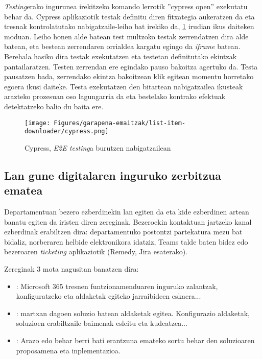 \textit{Testing}erako ingurunea irekitzeko komando lerrotik ''cypress open'' exekutatu behar da. Cypress aplikaziotik testak definitu diren fitxategia aukeratzen da eta tresnak kontrolatutako nabigatzaile-leiho bat irekiko da, \ref{cypress} irudian ikus daiteken moduan. Leiho honen alde batean test multzoko testak zerrendatzen dira alde batean, eta bestean zerrendaren orrialdea kargatu egingo da \textit{iframe} batean. Berehala hasiko dira testak exekutatzen eta testetan definitutako ekintzak pantailaratzen. Testen zerrendan ere egindako pauso bakoitza agertuko da. Testa pausatzen bada, zerrendako ekintza bakoitzean klik egitean momentu horretako egoera ikusi daiteke. Testa exekutatzen den bitartean nabigatzailea ikusteak arazteko prozesuan oso lagungarria da eta bestelako kontrako efektuak detektatzeko balio du baita ere. 

\begin{figure}[H]
\vspace{0.35cm}
\centering
\texttt{[image: Figures/garapena-emaitzak/list-item-downloader/cypress.png]}
\caption{Cypress, \textit{E2E testing}a burutzen nabigatzailean}
\label{cypress}
\end{figure}

\subsection{Lan gune digitalaren inguruko zerbitzua ematea}
Departamentuan bezero ezberdinekin lan egiten da eta kide ezberdinen artean banatu egiten da iristen diren zereginak.
Bezeroekin kontaktuan jartzeko kanal ezberdinak erabiltzen dira: departamentuko postontzi partekatura mezu bat bidaliz, norberaren helbide elektronikora idatziz, Teams talde baten bidez edo bezeroaren \textit{ticketing} aplikaziotik (Remedy, Jira esaterako). 

Zereginak 3 mota nagusitan banatzen dira:
\begin{itemize}
  \item {}: Microsoft 365 tresnen funtzionamenduaren inguruko zalantzak, konfiguratzeko eta aldaketak egiteko jarraibideen eskaera...
  \item {}: martxan dagoen soluzio batean aldaketak egitea. Konfigurazio aldaketak, soluzioen erabiltzaile baimenak esleitu eta kudeatzea...
  \item {}: Arazo edo behar berri bati erantzuna emateko sortu behar den soluzioaren proposamena eta inplementazioa. 
\end{itemize}


